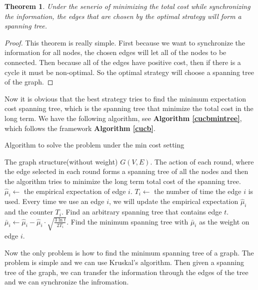\documentclass{article}
\theoremstyle{plain}
\newtheorem{thm}{Theorem}[section]
\theoremstyle{definition}
\theoremstyle{remark}
\begin{document}
    \begin{thm}\label{min-spanning-tree}
        Under the senerio of minimizing the total cost while synchronizing the information, the edges that are chosen by the optimal strategy will form a spanning tree.
    \end{thm}
    \begin{proof}
        This theorem is really simple. First because we want to synchronize the information for all nodes, the chosen edges will let all of the nodes to be connected. Then because all of the edges have positive cost, then if there is a cycle it must be non-optimal. So the optimal strategy will choose a spanning tree of the graph.
    \end{proof}

    Now it is obvious that the best strategy tries to find the minimum expectation cost spanning tree, which is the spanning tree that minimize the total cost in the long term. We have the following algorithm, see \textbf{Algorithm \ref{cucbmintree}}, which follows the framework \textbf{Algorithm \ref{cucb}}.

    \begin{algorithm}
        \caption{Algorithm to solve the problem under the min cost setting}
        \label{cucbmintree}
        \begin{algorithmic}[1]
        \Require The graph structure(without weight) $G(V,E)$.
        \Ensure The action of each round, where the edge selected in each round forms a spanning tree of all the nodes and then the algorithm tries to minimize the long term total cost of the spanning tree.
            \State $\hat \mu_i \leftarrow$ the empirical expectation of edge $i$.
            \State $T_i \leftarrow$ the number of time the edge $i$ is used.
            \State Every time we use an edge $i$, we will update the empirical expectation $\hat \mu_i$ and the counter $T_i$.
                \State Find an arbitrary spanning tree that contains edge $t$.
            \EndFor
                \State $\bar\mu_i \leftarrow \hat\mu_i - \hat\mu_i\cdot\sqrt{\frac{3\ln t}{2T_i}}$.
                \State Find the minimum spanning tree with $\bar\mu_i$ as the weight on edge $i$.
            \EndFor
        \EndProcedure
        \end{algorithmic}
    \end{algorithm}

    Now the only problem is how to find the minimum spanning tree of a graph. The problem is simple and we can use Kruskal's algorithm. Then given a spanning tree of the graph, we can transfer the information through the edges of the tree and we can synchronize the infromation.
\end{document}
